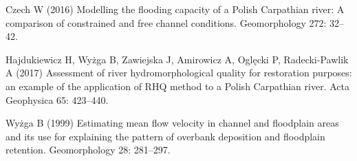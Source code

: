 {Czech W (2016) Modelling the flooding capacity of a Polish Carpathian river: A comparison of constrained and free channel conditions. Geomorphology 272: 32–42. 
	
	Hajdukiewicz H, Wyżga B, Zawiejska J, Amirowicz A, Oglęcki P, Radecki-Pawlik A (2017) Assessment of river hydromorphological quality for restoration purposes: an example of the application of RHQ method to a Polish Carpathian river. Acta Geophysica 65: 423–440. 
	
	Wyżga B (1999) Estimating mean flow velocity in channel and floodplain areas and its use for explaining the pattern of overbank deposition and floodplain retention. Geomorphology 28: 281–297. 
}%